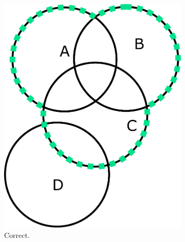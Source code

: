 \begin{figure}[htb]
	\centering
	\begin{subfigure}[b]{0.25\linewidth}
		\includegraphics[width=\textwidth]{figures/right_part.pdf}
		\caption{Correct.}
	\end{subfigure}
	~
	\begin{subfigure}[b]{0.25\linewidth}

\end{subfigure}
\end{figure}
